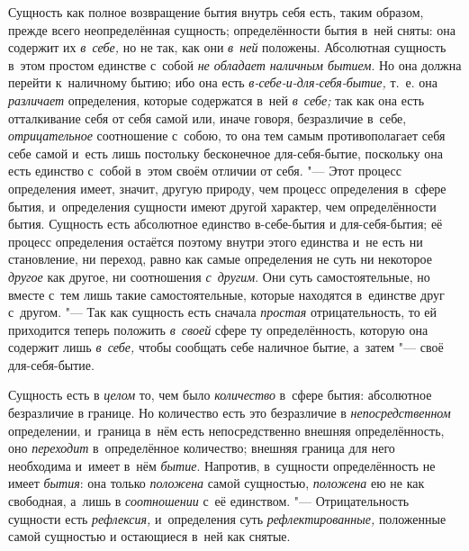 Сущность как полное возвращение бытия внутрь себя есть, таким образом,
прежде всего неопределённая сущность; определённости бытия в~ней сняты: она
содержит их {\em в~себе,} но не так, как они
{\em в~ней} положены. Абсолютная сущность в~этом
простом единстве с~собой {\em не обладает наличным
бытием}. Но она должна перейти к~наличному бытию; ибо она есть
{\em в-себе-и-для-себя-бытие,} т.~е. она
{\em различает} определения, которые содержатся в~ней
{\em в~себе;} так как она есть отталкивание себя от
себя самой или, иначе говоря, безразличие в~себе,
{\em отрицательное} соотношение с~собою, то она тем
самым противополагает себя себе самой и~есть лишь постольку бесконечное
для-себя-бытие, поскольку она есть единство с~собой в~этом своём отличии от
себя. "--- Этот процесс определения имеет, значит, другую природу, чем процесс
определения в~сфере бытия, и~определения сущности имеют другой характер,
чем определённости бытия. Сущность есть абсолютное единство в-себе-бытия и
для-себя-бытия; её процесс определения остаётся поэтому внутри этого
единства и~не есть ни становление, ни переход, равно как самые определения
не суть ни некоторое {\em другое} как другое, ни
соотношения {\em с~другим}. Они суть самостоятельные,
но вместе с~тем лишь такие самостоятельные, которые находятся в~единстве
друг с~другом. "--- Так как сущность есть сначала
{\em простая} отрицательность, то ей приходится теперь
положить {\em в~своей} сфере ту определённость, которую
она содержит лишь {\em в~себе,} чтобы сообщать себе
наличное бытие, а~затем "--- своё для-себя-бытие.

Сущность есть в {\em целом} то, чем было
{\em количество} в~сфере бытия: абсолютное безразличие
в границе. Но количество есть это безразличие в
{\em непосредственном} определении, и~граница в~нём
есть непосредственно внешняя определённость, оно
{\em переходит} в~определённое количество; внешняя
граница для него необходима и~имеет в~нём {\em бытие}.
Напротив, в~сущности определённость не имеет
{\em бытия}: она только
{\em положена} самой сущностью,
{\em положена} ею не как свободная, а~лишь в
{\em соотношении} с~её единством. "--- Отрицательность
сущности есть {\em рефлексия,} и~определения суть
{\em рефлектированные,} положенные самой сущностью и
остающиеся в~ней как снятые.


